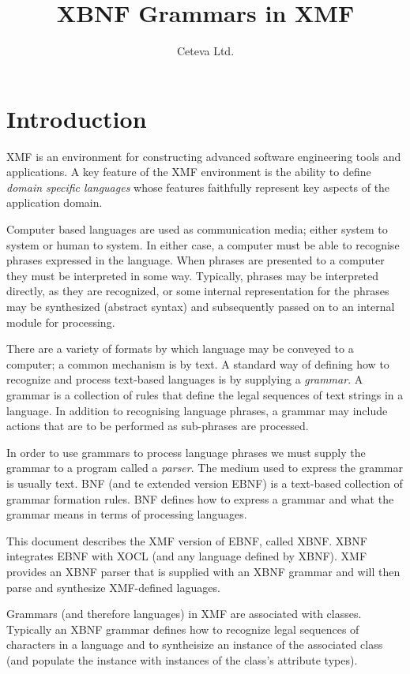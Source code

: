 \documentclass{article}
\title{XBNF Grammars in XMF}
\author{Ceteva Ltd.}
\begin{document}
\maketitle

\section{Introduction}

XMF is an environment for constructing advanced software engineering 
tools and applications. A key feature of the XMF environment is the
ability to define {\em domain specific languages} whose features
faithfully represent key aspects of the application domain.

Computer based languages are used as communication media; either system
to system or human to system. In either case, a computer must be able
to recognise phrases expressed in the language. When phrases are presented
to a computer they must be interpreted in some way. Typically, phrases
may be interpreted directly, as they are recognized, or some internal
representation for the phrases may be synthesized (abstract syntax) and
subsequently passed on to an internal module for processing.

There are a variety of formats by which language may be conveyed to a 
computer; a common mechanism is by text. A standard way of defining how
to recognize and process text-based languages is by supplying a {\em grammar}.
A grammar is a collection of rules that define the legal sequences of
text strings in a language. In addition to recognising language phrases,
a grammar may include actions that are to be performed as sub-phrases
are processed.

In order to use grammars to process language phrases we must supply the
grammar to a program called a {\em parser}. The medium used to express the
grammar is usually text. BNF (and te extended version EBNF) is a text-based 
collection of grammar formation rules. BNF defines how to express a grammar
and what the grammar means in terms of processing languages. 

This document describes the XMF version of EBNF, called XBNF. XBNF integrates
EBNF with XOCL (and any language defined by XBNF). XMF provides an XBNF
parser that is supplied with an XBNF grammar and will then parse and synthesize
XMF-defined laguages.

Grammars (and therefore languages) in XMF are associated with classes. Typically 
an XBNF grammar defines how to recognize legal sequences of characters in a 
language and to syntheisize an instance of the associated class (and populate the
instance with instances of the class's attribute types).
\end{document}
